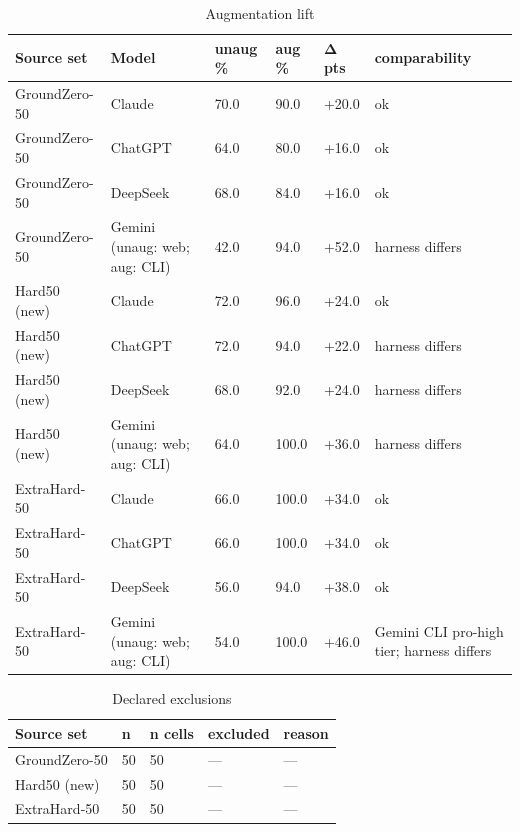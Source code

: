 \begin{table}[t]\centering\small\caption{Augmentation lift}\label{tab:delta}
\begin{tabular}{llllll}
\toprule
Source set & Model & unaug \% & aug \% & Δ pts & comparability \\
\midrule
GroundZero-50 & Claude & 70.0 & 90.0 & +20.0 & ok \\
GroundZero-50 & ChatGPT & 64.0 & 80.0 & +16.0 & ok \\
GroundZero-50 & DeepSeek & 68.0 & 84.0 & +16.0 & ok \\
GroundZero-50 & Gemini (unaug: web; aug: CLI) & 42.0 & 94.0 & +52.0 & harness differs \\
Hard50 (new) & Claude & 72.0 & 96.0 & +24.0 & ok \\
Hard50 (new) & ChatGPT & 72.0 & 94.0 & +22.0 & harness differs \\
Hard50 (new) & DeepSeek & 68.0 & 92.0 & +24.0 & harness differs \\
Hard50 (new) & Gemini (unaug: web; aug: CLI) & 64.0 & 100.0 & +36.0 & harness differs \\
ExtraHard-50 & Claude & 66.0 & 100.0 & +34.0 & ok \\
ExtraHard-50 & ChatGPT & 66.0 & 100.0 & +34.0 & ok \\
ExtraHard-50 & DeepSeek & 56.0 & 94.0 & +38.0 & ok \\
ExtraHard-50 & Gemini (unaug: web; aug: CLI) & 54.0 & 100.0 & +46.0 & Gemini CLI pro-high tier; harness differs \\
\bottomrule
\end{tabular}
\end{table}


\begin{table}[t]\centering\small\caption{Declared exclusions}\label{tab:excl}
\begin{tabular}{lllll}
\toprule
Source set & n & n cells & excluded & reason \\
\midrule
GroundZero-50 & 50 & 50 & — & — \\
Hard50 (new) & 50 & 50 & — & — \\
ExtraHard-50 & 50 & 50 & — & — \\
\bottomrule
\end{tabular}
\end{table}


